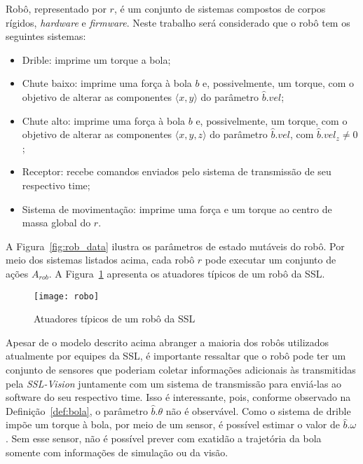 \begin{defi}[Robô]
  Robô, representado por $r$, é um conjunto de sistemas compostos de corpos
  rígidos, \textit{hardware} e \textit{firmware}. Neste trabalho será
  considerado que o robô tem os seguintes sistemas:

  \begin{itemize}
    \item Drible: imprime um torque a bola;
    \item Chute baixo: imprime uma força à bola $b$ e, possivelmente, um torque,
      com o objetivo de alterar as componentes $\langle x,y \rangle$ do
      parâmetro $\hat{b}.vel$;
    \item Chute alto: imprime uma força à bola $b$ e, possivelmente, um torque,
      com o objetivo de alterar as componentes $\langle x,y,z \rangle$ do
      parâmetro $\hat{b}.vel$, com $\hat{b}.vel_z \neq 0$;
    \item Receptor: recebe comandos enviados pelo sistema de transmissão de seu
      respectivo time;
    \item Sistema de movimentação: imprime uma força e um torque ao centro de
      massa global do $r$.
  \end{itemize}
\end{defi}

A Figura~\ref{fig:rob_data} ilustra os parâmetros de estado mutáveis do robô.
Por meio dos sistemas listados acima, cada robô $r$ pode executar um conjunto de
ações $A_{rob}$. A Figura~\ref{fig:robo} apresenta os atuadores típicos de um
robô da SSL.

\begin{figure}[H]
  \centering
  \texttt{[image: robo]}
  \caption{Atuadores típicos de um robô da SSL}\label{fig:robo}
\end{figure}

Apesar de o modelo descrito acima abranger a maioria dos robôs utilizados
atualmente por equipes da SSL, é importante ressaltar que o robô pode ter um
conjunto de sensores que poderiam coletar informações adicionais às transmitidas
pela \textit{SSL-Vision} juntamente com um sistema de transmissão para enviá-las
ao software do seu respectivo time. Isso é interessante, pois, conforme
observado na Definição~\ref{def:bola}, o parâmetro $\hat{b}.\theta$ não é
observável. Como o sistema de drible impõe um torque à bola, por meio de um
sensor, é possível estimar o valor de $\hat{b}.\omega$. Sem esse sensor, não é
possível prever com exatidão a trajetória da bola somente com informações de
simulação ou da visão.


